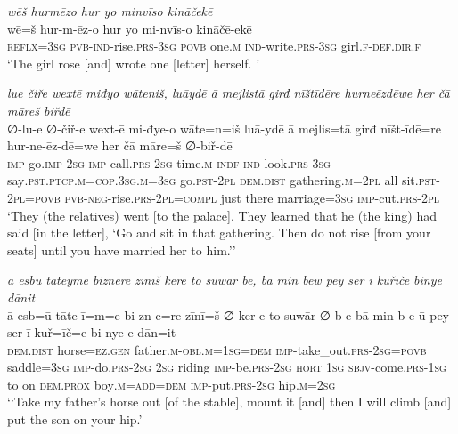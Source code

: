 \ea \label{KŠ.79}
\textit{wēš hurmēzo hur yo minvīso kināčekē} \\ 
\gll wē=š hur-m-ēz-o hur yo mi-nvīs-o kināčē-ekē \\ 
 \textsc{reflx}\textsc{=3sg} \textsc{pvb-}\textsc{ind-}rise\textsc{.prs}\textsc{-3sg} \textsc{povb} one\textsc{.m} \textsc{ind-}write\textsc{.prs}\textsc{-3sg} girl\textsc{.f}\textsc{-def}\textsc{.dir}\textsc{.f} \\ 
\glt `The girl rose [and] wrote one [letter] herself. '
\z 
 
\ea \label{KŠ.87}
\textit{lue čiře wextē miđyo wāteniš, luāydē ā mejlistā girđ nīštīdēre hurneēzdēwe her čā māreš biřdē} \\ 
\gll ∅-lu-e ∅-čiř-e wext-ē mi-đye-o wāte=n=iš luā-ydē ā mejlis=tā girđ nīšt-īdē=re hur-ne-ēz-dē=we her čā māre=š ∅-biř-dē \\ 
 \textsc{imp-}go.\textsc{imp-}\textsc{2sg} \textsc{imp-}call\textsc{.prs}-\textsc{2sg} time\textsc{.m}\textsc{-indf} \textsc{ind-}look\textsc{.prs}\textsc{-3sg} say\textsc{.pst}\textsc{.ptcp}\textsc{.m}\textsc{=cop}\textsc{.3sg}\textsc{.m}\textsc{=3sg} go\textsc{.pst}-\textsc{2pl} \textsc{dem.dist} gathering\textsc{.m}=\textsc{2pl} all sit\textsc{.pst}-\textsc{2pl}\textsc{=\textsc{povb}} \textsc{pvb-}\textsc{neg-}rise\textsc{.prs}-\textsc{2pl}\textsc{=compl} just there marriage\textsc{=3sg} \textsc{imp-}cut\textsc{.prs}-\textsc{2pl} \\ 
\glt `They (the relatives) went [to the palace]. They learned that he (the king) had said [in the letter], ‘Go and sit in that gathering. Then do not rise [from your seats] until you have married her to him.’'
\z 
 
\ea \label{KŠ.96}
\textit{ā esbū tāteyme biznere zīnīš kere to suwār be, bā min bew pey ser ī kuřīče binye dānit} \\ 
\gll ā esb=ū tāte-ī=m=e bi-zn-e=re zīnī=š ∅-ker-e to suwār ∅-b-e bā min b-e-ū pey ser ī kuř=īč=e bi-nye-e dān=it \\ 
 \textsc{dem.dist} horse\textsc{\textsc{=ez.gen}} father\textsc{.m}\textsc{-obl}\textsc{.m}\textsc{=\textsc{1sg}}\textsc{=dem} \textsc{imp-}take\_out\textsc{.prs}-\textsc{2sg}\textsc{=\textsc{povb}} saddle\textsc{=3sg} \textsc{imp-}do\textsc{.prs}-\textsc{2sg} \textsc{2sg} riding \textsc{imp-}be\textsc{.prs}-\textsc{2sg} \textsc{hort} \textsc{1sg} \textsc{sbjv-}come\textsc{.prs}\textsc{-\textsc{1sg}} to on \textsc{dem.prox} boy\textsc{.m}\textsc{=add}\textsc{=dem} \textsc{imp-}put\textsc{.prs}-\textsc{2sg} hip\textsc{.m}\textsc{=\textsc{2sg}} \\ 
\glt `‘Take my father’s horse out [of the stable], mount it [and] then I will climb [and] put the son on your hip.'
\z 
 
